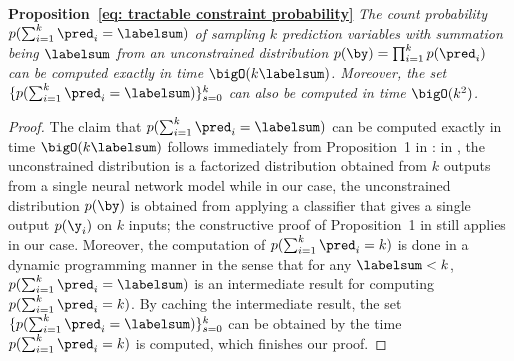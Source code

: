 \documentclass{article}
\begin{document}
\textbf{Proposition~\ref{eq: tractable constraint probability}}
\emph{
The count probability $p(\sum_{i = 1}^k \pred_i = \labelsum)$ of sampling $k$ prediction variables with summation being $\labelsum$ from an unconstrained distribution $p(\by) = \prod_{i = 1}^k p(\pred_i)$ can be computed exactly in time $\bigO(k\labelsum)$.
Moreover, 
the set $\{ p(\sum_{i = 1}^k \pred_i = \labelsum) \}_{s = 0}^k$ can also be computed in time $\bigO(k^2)$.
}

\begin{proof}
The claim that $p(\sum_{i = 1}^k \pred_i = \labelsum)$ can be computed exactly in time $\bigO(k\labelsum)$ follows immediately from Proposition~1 in \citet{simple2023}:
in \citet{simple2023}, the unconstrained distribution is a factorized distribution obtained from $k$ outputs from a single neural network model while in our case, the unconstrained distribution $p(\by)$ is obtained from applying a classifier that gives a single output $p(\y_i)$ on $k$ inputs;
the constructive proof of Proposition~1 in \citet{simple2023} still applies in our case.
Moreover, the computation of $p(\sum_{i = 1}^k \pred_i = k)$ is done in a dynamic programming manner in the sense that for any $\labelsum < k$, $p(\sum_{i = 1}^k \pred_i = \labelsum)$ is an intermediate result for computing $p(\sum_{i = 1}^k \pred_i = k)$.
By caching the intermediate result, the set $\{ p(\sum_{i = 1}^k \pred_i = \labelsum) \}_{s = 0}^k$ can be obtained by the time $p(\sum_{i = 1}^k \pred_i = k)$ is computed, which finishes our proof.
\end{proof}
\end{document}
